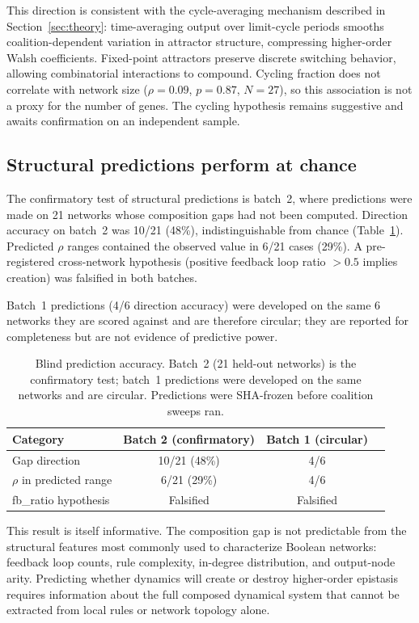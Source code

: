 \documentclass[10pt]{article}
\begin{document}
This direction is consistent with the cycle-averaging mechanism
described in Section~\ref{sec:theory}: time-averaging output over
limit-cycle periods smooths coalition-dependent variation in attractor
structure, compressing higher-order Walsh coefficients. Fixed-point
attractors preserve discrete switching behavior, allowing
combinatorial interactions to compound. Cycling fraction does not
correlate with network size ($\rho = 0.09$, $p = 0.87$, $N = 27$),
so this association is not a proxy for the number of genes. The
cycling hypothesis remains suggestive and awaits confirmation on an
independent sample.


\subsection{Structural predictions perform at chance}
\label{sec:blind-results}

The confirmatory test of structural predictions is batch~2, where
predictions were made on 21 networks whose composition gaps had not
been computed. Direction accuracy on batch~2 was 10/21 (48\%),
indistinguishable from chance (Table~\ref{tab:blind}). Predicted
$\rho$ ranges contained the observed value in 6/21 cases (29\%). A
pre-registered cross-network hypothesis (positive feedback loop ratio
$> 0.5$ implies creation) was falsified in both batches.

Batch~1 predictions (4/6 direction accuracy) were developed on the
same 6 networks they are scored against and are therefore circular;
they are reported for completeness but are not evidence of predictive
power.

\begin{table}[t]
\centering
\caption{Blind prediction accuracy. Batch~2 (21 held-out networks) is
the confirmatory test; batch~1 predictions were developed on the same
networks and are circular. Predictions were SHA-frozen before
coalition sweeps ran.}
\label{tab:blind}
\begin{tabular}{lccc}
\toprule
Category & Batch 2 (confirmatory) & Batch 1 (circular) \\
\midrule
Gap direction & 10/21 (48\%) & 4/6 \\
$\rho$ in predicted range & 6/21 (29\%) & 4/6 \\
fb\_ratio hypothesis & Falsified & Falsified \\
\bottomrule
\end{tabular}
\end{table}

This result is itself informative. The composition gap is not
predictable from the structural features most commonly used to
characterize Boolean networks: feedback loop counts, rule complexity,
in-degree distribution, and output-node arity. Predicting whether
dynamics will create or destroy higher-order epistasis requires
information about the full composed dynamical system that cannot be
extracted from local rules or network topology alone.
\end{document}
